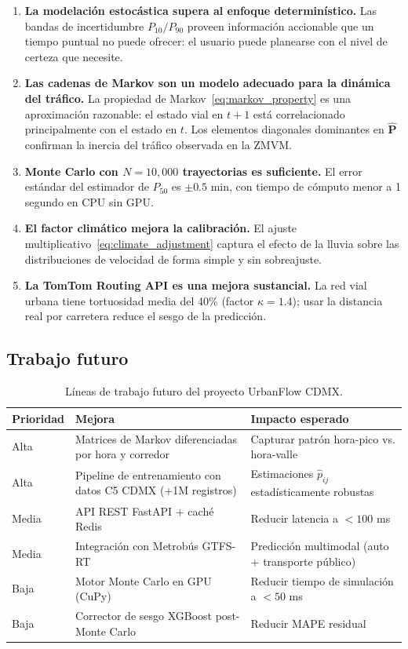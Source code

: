 \documentclass[12pt, a4paper]{article}
\theoremstyle{definition}
\begin{document}
\begin{enumerate}
    \item \textbf{La modelación estocástica supera al enfoque determinístico.}
    Las bandas de incertidumbre $P_{10}/P_{90}$ proveen información accionable que
    un tiempo puntual no puede ofrecer: el usuario puede planearse con el nivel
    de certeza que necesite.

    \item \textbf{Las cadenas de Markov son un modelo adecuado para la dinámica
    del tráfico.} La propiedad de Markov~\eqref{eq:markov_property} es una
    aproximación razonable: el estado vial en $t+1$ está correlacionado principalmente
    con el estado en $t$. Los elementos diagonales dominantes en $\hat{\mathbf{P}}$
    confirman la inercia del tráfico observada en la ZMVM.

    \item \textbf{Monte Carlo con $N = 10{,}000$ trayectorias es suficiente.}
    El error estándar del estimador de $P_{50}$ es $\pm 0.5$ min, con tiempo
    de cómputo menor a 1 segundo en CPU sin GPU.

    \item \textbf{El factor climático mejora la calibración.} El ajuste
    multiplicativo~\eqref{eq:climate_adjustment} captura el efecto de la lluvia
    sobre las distribuciones de velocidad de forma simple y sin sobreajuste.

    \item \textbf{La TomTom Routing API es una mejora sustancial.} La red vial
    urbana tiene tortuosidad media del 40\% (factor $\kappa = 1.4$); usar la
    distancia real por carretera reduce el sesgo de la predicción.
\end{enumerate}

\subsection{Trabajo futuro}

\begin{table}[h!]
\centering
\renewcommand{\arraystretch}{1.3}
\begin{tabularx}{\textwidth}{llX}
\toprule
\textbf{Prioridad} & \textbf{Mejora} & \textbf{Impacto esperado} \\
\midrule
Alta & Matrices de Markov diferenciadas por hora y corredor &
Capturar patrón hora-pico vs. hora-valle \\
Alta & Pipeline de entrenamiento con datos C5 CDMX (+1M registros) &
Estimaciones $\hat{p}_{ij}$ estadísticamente robustas \\
Media & API REST FastAPI + caché Redis &
Reducir latencia a $< 100$ ms \\
Media & Integración con Metrobús GTFS-RT &
Predicción multimodal (auto + transporte público) \\
Baja & Motor Monte Carlo en GPU (CuPy) &
Reducir tiempo de simulación a $< 50$ ms \\
Baja & Corrector de sesgo XGBoost post-Monte Carlo &
Reducir MAPE residual \\
\bottomrule
\end{tabularx}
\caption{Líneas de trabajo futuro del proyecto UrbanFlow CDMX.}
\end{table}
\end{document}
